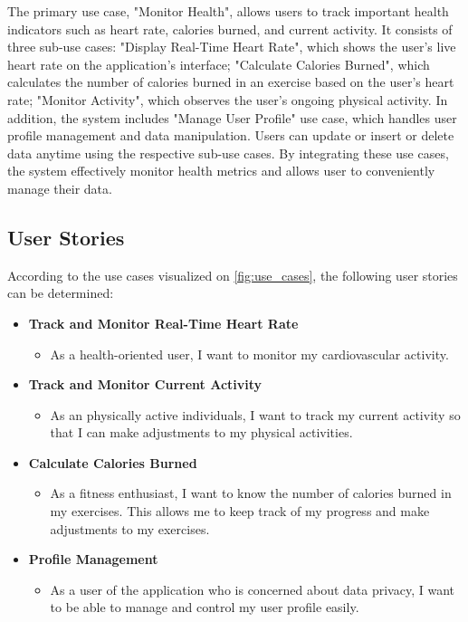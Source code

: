 The primary use case, "Monitor Health", allows users to track important health indicators such as heart rate, calories burned, and current activity. It consists of three sub-use cases: "Display Real-Time Heart Rate", which shows the user's live heart rate on the application's interface; "Calculate Calories Burned", which calculates the number of calories burned in an exercise based on the user's heart rate;  "Monitor Activity", which observes the user's ongoing physical activity. In addition, the system includes "Manage User Profile" use case, which handles user profile management and data manipulation. Users can update or insert or delete data anytime using the respective sub-use cases. By integrating these use cases, the system effectively monitor health metrics and allows user to conveniently manage their data.

\subsection{User Stories}
\label{chap:user_stories}
According to the use cases visualized on \autoref{fig:use_cases}, the following user stories can be determined:

\begin{itemize}[label={},leftmargin=*]
    \item \textbf{Track and Monitor Real-Time Heart Rate}
      \begin{itemize}[label={},leftmargin=*]
        \item As a health-oriented user, I want to monitor my cardiovascular activity.
      \end{itemize}

    \item \textbf{Track and Monitor Current Activity}
      \begin{itemize}[label={},leftmargin=*]
        \item As an physically active individuals, I want to track my current activity so that I can make adjustments to my physical activities.
      \end{itemize}

    \item \textbf{Calculate Calories Burned}
      \begin{itemize}[label={},leftmargin=*]
        \item As a fitness enthusiast, I want to know the number of calories burned in my exercises. This allows me to keep track of my progress and make adjustments to my exercises.
      \end{itemize}  

    \item \textbf{Profile Management}
      \begin{itemize}[label={},leftmargin=*]
        \item As a user of the application who is concerned about data privacy, I want to be able to manage and control my user profile easily. 
      \end{itemize}
  \end{itemize}


